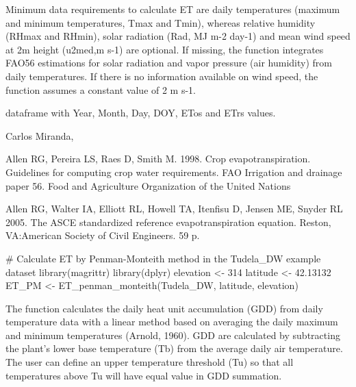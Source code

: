 \documentclass[a4paper]{book}
\begin{document}
%
\begin{Details}\relax
Minimum data requirements to calculate ET are daily temperatures (maximum 
and minimum temperatures, Tmax and Tmin), whereas relative humidity (RHmax and 
RHmin), solar radiation (Rad, MJ m-2 day-1) and mean wind speed at 2m height
(u2med,m s-1) are optional. If missing, the function integrates FAO56 estimations 
for solar radiation and vapor pressure (air humidity) from daily 
temperatures. If there is no information available on wind speed, the function 
assumes a constant value of 2 m s-1.
\end{Details}
%
\begin{Value}
dataframe with Year, Month, Day, DOY, ETos and ETrs values.
\end{Value}
%
\begin{Author}\relax
Carlos Miranda, 
\end{Author}
%
\begin{References}\relax
Allen RG, Pereira LS, Raes D, Smith M. 1998. Crop evapotranspiration. Guidelines
for computing crop water requirements. FAO Irrigation and drainage paper 56. Food 
and Agriculture Organization of the United Nations

Allen RG, Walter IA, Elliott RL, Howell TA, Itenfisu D, Jensen ME, Snyder RL 2005. 
The ASCE standardized reference evapotranspiration equation. Reston, VA:American 
Society of Civil Engineers. 59 p.
\end{References}
%
\begin{Examples}
\begin{ExampleCode}

# Calculate ET by Penman-Monteith method in the Tudela_DW example dataset
library(magrittr)
library(dplyr)
elevation <- 314
latitude <- 42.13132
ET_PM <- ET_penman_monteith(Tudela_DW, latitude, elevation)

\end{ExampleCode}
\end{Examples}
%
\begin{Description}\relax
The function calculates the daily heat unit accumulation (GDD)
from daily temperature data with a linear method based on averaging
the daily maximum and minimum temperatures (Arnold, 1960). GDD are
calculated by subtracting the plant's lower base temperature (Tb) 
from the average daily air temperature. The user can define an upper 
temperature threshold (Tu) so that all temperatures above Tu will 
have equal value in GDD summation.
\end{Description}
\end{document}
